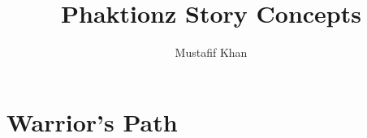 \documentclass[12pt, letterpaper]{article}
\title{Phaktionz Story Concepts}
\author{Mustafif Khan}
\date{}
\begin{document}
\maketitle
\newpage
\tableofcontents
\newpage
\part{Warrior's Path}

\end{document}
